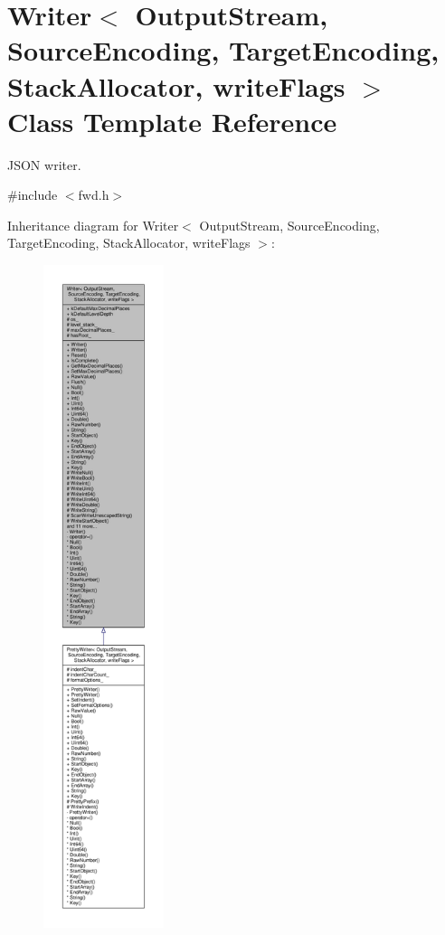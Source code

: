 \hypertarget{classWriter}{}\section{Writer$<$ Output\+Stream, Source\+Encoding, Target\+Encoding, Stack\+Allocator, write\+Flags $>$ Class Template Reference}
\label{classWriter}


J\+S\+ON writer.  




{\ttfamily \#include $<$fwd.\+h$>$}



Inheritance diagram for Writer$<$ Output\+Stream, Source\+Encoding, Target\+Encoding, Stack\+Allocator, write\+Flags $>$\+:
\nopagebreak
\begin{figure}[H]
\begin{center}
\leavevmode
\includegraphics[height=550pt]{classWriter__inherit__graph}
\end{center}
\end{figure}


